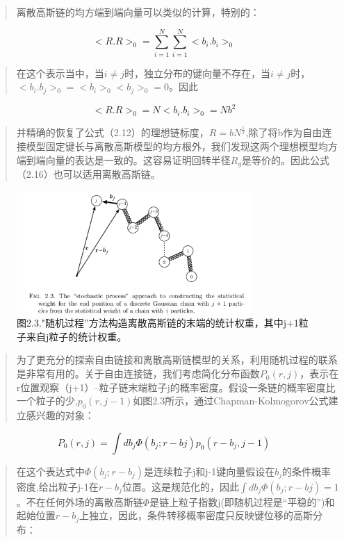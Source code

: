 \begin{quotation}
离散高斯链的均方端到端向量可以类似的计算，特别的：
\end{quotation}
\begin{equation}
<R.R>_{0}=\sum_{i=1}^{N}\sum_{i=1}^{N}<b_{i}.b_{i}>_{0}
\end{equation}
\begin{quotation}
在这个表示当中，当$i\neq j$时，独立分布的键向量不存在，当$i\neq j$时，$<b_{i}.b_{j}>_{0}=<b_{i}>_{0}<b_{j}>_{0}=0$。因此
\end{quotation}
\begin{equation}
<R.R>_{0}=N<b_{i}.b_{i}>_{0}=Nb^2
\end{equation}
\begin{quotation}
并精确的恢复了公式（2.12）的理想链标度，$R=bN^\frac{1}{2}$,除了将b作为自由连接模型固定键长与离散高斯模型的均方根外，我们发现这两个理想模型均方端到端向量的表达是一致的。这容易证明回转半径$R_{g}$是等价的。因此公式（2.16）也可以适用离散高斯链。
\end{quotation}
\begin{figure}
\centering
\includegraphics[width=9cm]{./figures/23.png}
\caption{图2.3."随机过程”方法构造离散高斯链的末端的统计权重，其中j+1粒子来自j粒子的统计权重。}
\end{figure}
\newpage
\begin{quotation}
为了更充分的探索自由链接和离散高斯链模型的关系，利用随机过程的联系是非常有用的。关于自由连接链，我们考虑简化分布函数$P_{0}(r,j)$，表示在r位置观察（j+1）--粒子链末端粒子j的概率密度。假设一条链的概率密度比一个粒子的少,$p_{0}(r,j-1)$如图2.3所示，通过Chapman-Kolmogorov公式建立感兴趣的对象：
\end{quotation}
\begin{equation}
P_{0}(r,j)=\int db_{j} \varPhi (b_{j};r-b{j})p_{0}(r-b_{j},j-1)
\end{equation}
\begin{quotation}
在这个表达式中$\varPhi (b_{j};r-b_{j})$是连续粒子j和j-1键向量假设在$b_{j}$的条件概率密度,给出粒子j-1在$r-b_{j}$位置。这是规范化的，因此$\int db_{j} \varPhi (b_{j};r-b{j})=1$。不在任何外场的离散高斯链$\varPhi$是链上粒子指数j(即随机过程是“平稳的”)和起始位置$r-b_{j}$上独立，因此，条件转移概率密度只反映键位移的高斯分布：
\end{quotation}
